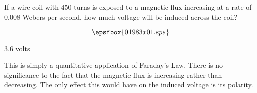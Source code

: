 

If a wire coil with 450 turns is exposed to a magnetic flux increasing at a rate of 0.008 Webers per second, how much voltage will be induced across the coil?

$$\epsfbox{01983x01.eps}$$







3.6 volts







This is simply a quantitative application of Faraday's Law.  There is no significance to the fact that the magnetic flux is increasing rather than decreasing.  The only effect this would have on the induced voltage is its polarity.




